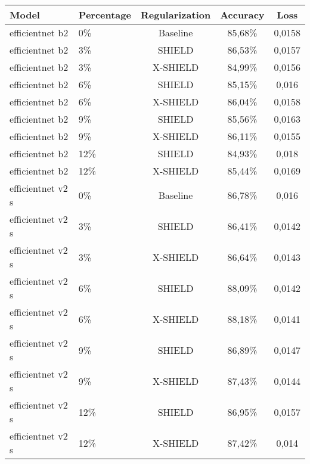 \begin{tabular}{llccc}
\toprule
Model & Percentage & Regularization & Accuracy & Loss \\
\midrule
efficientnet b2 & 0\% & Baseline & 85,68\% & 0,0158 \\
efficientnet b2 & 3\% & SHIELD & 86,53\% & 0,0157 \\
efficientnet b2 & 3\% & X-SHIELD & 84,99\% & 0,0156 \\
efficientnet b2 & 6\% & SHIELD & 85,15\% & 0,016 \\
efficientnet b2 & 6\% & X-SHIELD & 86,04\% & 0,0158 \\
efficientnet b2 & 9\% & SHIELD & 85,56\% & 0,0163 \\
efficientnet b2 & 9\% & X-SHIELD & 86,11\% & 0,0155 \\
efficientnet b2 & 12\% & SHIELD & 84,93\% & 0,018 \\
efficientnet b2 & 12\% & X-SHIELD & 85,44\% & 0,0169 \\
efficientnet v2 s & 0\% & Baseline & 86,78\% & 0,016 \\
efficientnet v2 s & 3\% & SHIELD & 86,41\% & 0,0142 \\
efficientnet v2 s & 3\% & X-SHIELD & 86,64\% & 0,0143 \\
efficientnet v2 s & 6\% & SHIELD & 88,09\% & 0,0142 \\
efficientnet v2 s & 6\% & X-SHIELD & 88,18\% & 0,0141 \\
efficientnet v2 s & 9\% & SHIELD & 86,89\% & 0,0147 \\
efficientnet v2 s & 9\% & X-SHIELD & 87,43\% & 0,0144 \\
efficientnet v2 s & 12\% & SHIELD & 86,95\% & 0,0157 \\
efficientnet v2 s & 12\% & X-SHIELD & 87,42\% & 0,014 \\
\bottomrule
\end{tabular}
